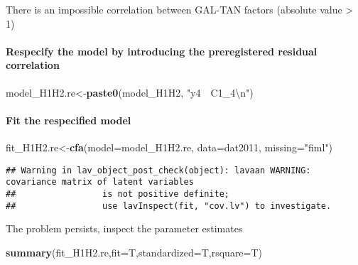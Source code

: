\documentclass[
]{article}
\newenvironment{Shaded}{\begin{snugshade}}{\end{snugshade}}
\newcommand{\CharTok}[1]{\textcolor[rgb]{0.31,0.60,0.02}{#1}}
\newcommand{\DataTypeTok}[1]{\textcolor[rgb]{0.13,0.29,0.53}{#1}}
\newcommand{\KeywordTok}[1]{\textcolor[rgb]{0.13,0.29,0.53}{\textbf{#1}}}
\newcommand{\NormalTok}[1]{#1}
\newcommand{\StringTok}[1]{\textcolor[rgb]{0.31,0.60,0.02}{#1}}
\begin{document}
There is an impossible correlation between GAL-TAN factors (absolute
value \textgreater{} 1)

\newpage

\hypertarget{respecify-the-model-by-introducing-the-preregistered-residual-correlation}{%
\paragraph{Respecify the model by introducing the preregistered residual
correlation}\label{respecify-the-model-by-introducing-the-preregistered-residual-correlation}}

\begin{Shaded}
\begin{Highlighting}[]
\NormalTok{model_H1H2.re<-}\KeywordTok{paste0}\NormalTok{(model_H1H2,}
                      \StringTok{"y4~~C1_4}\CharTok{\textbackslash{}n}\StringTok{"}\NormalTok{)}
\end{Highlighting}
\end{Shaded}

\hypertarget{fit-the-respecified-model}{%
\paragraph{Fit the respecified model}\label{fit-the-respecified-model}}

\begin{Shaded}
\begin{Highlighting}[]
\NormalTok{fit_H1H2.re<-}\KeywordTok{cfa}\NormalTok{(}\DataTypeTok{model=}\NormalTok{model_H1H2.re,}
              \DataTypeTok{data=}\NormalTok{dat2011,}
              \DataTypeTok{missing=}\StringTok{"fiml"}\NormalTok{)}
\end{Highlighting}
\end{Shaded}

\begin{verbatim}
## Warning in lav_object_post_check(object): lavaan WARNING: covariance matrix of latent variables
##                 is not positive definite;
##                 use lavInspect(fit, "cov.lv") to investigate.
\end{verbatim}

The problem persists, inspect the parameter estimates

\begin{Shaded}
\begin{Highlighting}[]
\KeywordTok{summary}\NormalTok{(fit_H1H2.re,}\DataTypeTok{fit=}\NormalTok{T,}\DataTypeTok{standardized=}\NormalTok{T,}\DataTypeTok{rsquare=}\NormalTok{T)}
\end{Highlighting}
\end{Shaded}
\end{document}

